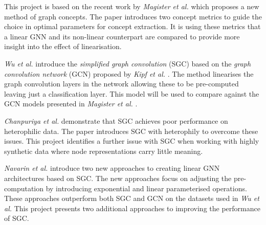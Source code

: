 




This project is based on the recent work by \textit{Magister et al.} \cite{magister2021gcexplainer} which proposes a new method of graph concepts.
The paper introduces two concept metrics to guide the choice in optimal parameters for concept extraction.
It is using these metrics that a linear GNN and its non-linear counterpart are compared to provide more insight into the effect of linearisation.




\textit{Wu et al.} \cite{wu2019simplifying} introduce the \emph{simplified graph convolution} (SGC) based on the \emph{graph convolution network} (GCN) proposed by \textit{Kipf et al.} \cite{kipf2016semi}.
The method linearises the graph convolution layers in the network allowing these to be pre-computed leaving just a classification layer.
This model will be used to compare against the GCN models presented in \textit{Magister et al.} \cite{magister2021gcexplainer}.




\textit{Chanpuriya et al.} \cite{chanpuriya2022simplified} demonstrate that SGC achieves poor performance on heterophilic data.
The paper introduces SGC with heterophily to overcome these issues. 
This project identifies a further issue with SGC when working with highly synthetic data where node representations carry little meaning.

\textit{Navarin et al.} \cite{navarin2020linear} introduce two new approaches to creating linear GNN architectures based on SGC.
The new approaches focus on adjusting the pre-computation by introducing exponential and linear parameterised operations.
These approaches outperform both SGC and GCN on the datasets used in \textit{Wu et al.}
This project presents two additional approaches to improving the performance of SGC.

